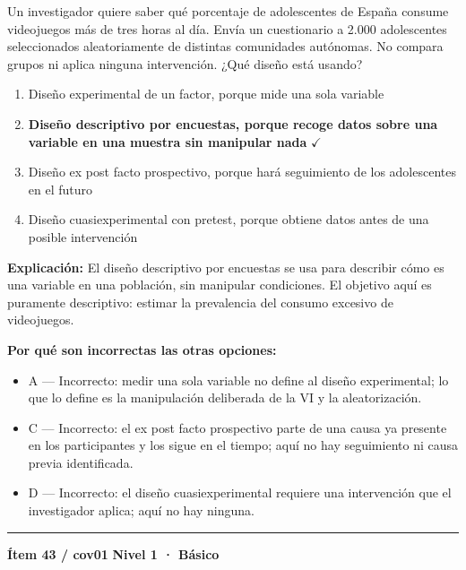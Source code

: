 \documentclass[12pt,a4paper]{article}
\begin{document}
Un investigador quiere saber qué porcentaje de adolescentes de España consume videojuegos más de tres horas al día. Envía un cuestionario a 2.000 adolescentes seleccionados aleatoriamente de distintas comunidades autónomas. No compara grupos ni aplica ninguna intervención. ¿Qué diseño está usando?

\begin{enumerate}
  \item[A.] Diseño experimental de un factor, porque mide una sola variable
  \item[\textbf{\color{verde}B.}] \textbf{\color{verde} Diseño descriptivo por encuestas, porque recoge datos sobre una variable en una muestra sin manipular nada} \hfill $\checkmark$
  \item[C.] Diseño ex post facto prospectivo, porque hará seguimiento de los adolescentes en el futuro
  \item[D.] Diseño cuasiexperimental con pretest, porque obtiene datos antes de una posible intervención
\end{enumerate}

\noindent\textbf{\color{azul}Explicación:} El diseño descriptivo por encuestas se usa para describir cómo es una variable en una población, sin manipular condiciones. El objetivo aquí es puramente descriptivo: estimar la prevalencia del consumo excesivo de videojuegos.

\noindent\textbf{\color{gris}Por qué son incorrectas las otras opciones:}
\begin{itemize}
  \item {\small A — Incorrecto: medir una sola variable no define al diseño experimental; lo que lo define es la manipulación deliberada de la VI y la aleatorización.}
  \item {\small C — Incorrecto: el ex post facto prospectivo parte de una causa ya presente en los participantes y los sigue en el tiempo; aquí no hay seguimiento ni causa previa identificada.}
  \item {\small D — Incorrecto: el diseño cuasiexperimental requiere una intervención que el investigador aplica; aquí no hay ninguna.}
\end{itemize}
\vspace{8pt}\hrule\vspace{10pt}

\begin{mdframed}[backgroundcolor=fondogris,linecolor=azul,linewidth=1pt,innerleftmargin=10pt,innerrightmargin=10pt,innertopmargin=7pt,innerbottommargin=7pt]
\textbf{Ítem 43 / cov01} \hfill {\small\bfseries\color{azul} Nivel 1 · Básico}
\end{mdframed}
\end{document}
